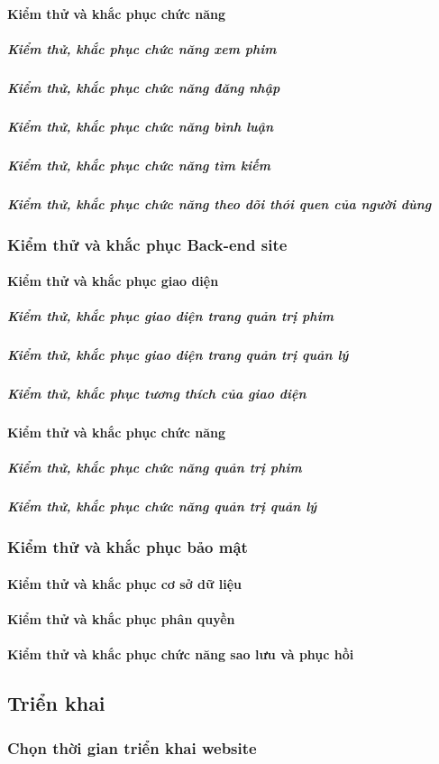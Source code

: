 \documentclass[a4paper]{book}
\begin{document}
\paragraph{Kiểm thử và khắc phục chức năng}
\subparagraph{Kiểm thử, khắc phục chức năng xem phim}
\subparagraph{Kiểm thử, khắc phục chức năng đăng nhập}
\subparagraph{Kiểm thử, khắc phục chức năng bình luận}
\subparagraph{Kiểm thử, khắc phục chức năng tìm kiếm}
\subparagraph{Kiểm thử, khắc phục chức năng theo dõi thói quen của người dùng}
\subsubsection{Kiểm thử và khắc phục Back-end site}
\paragraph{Kiểm thử và khắc phục giao diện}
\subparagraph{Kiểm thử, khắc phục giao diện trang quản trị phim}
\subparagraph{Kiểm thử, khắc phục giao diện trang quản trị quản lý}
\subparagraph{Kiểm thử, khắc phục tương thích của giao diện}
\paragraph{Kiểm thử và khắc phục chức năng}
\subparagraph{Kiểm thử, khắc phục chức năng quản trị phim}
\subparagraph{Kiểm thử, khắc phục chức năng quản trị quản lý}
\subsubsection{Kiểm thử và khắc phục bảo mật}
\paragraph{Kiểm thử và khắc phục cơ sở dữ liệu}
\paragraph{Kiểm thử và khắc phục phân quyền}
\paragraph{Kiểm thử và khắc phục chức năng sao lưu và phục hồi}
\subsection{Triển khai}
\subsubsection{Chọn thời gian triển khai website}
\end{document}
